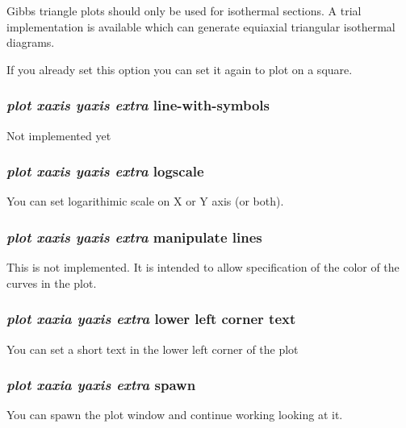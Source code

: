 \documentclass[11pt]{article}
\begin{document}
Gibbs triangle plots should only be used for isothermal sections.  A
trial implementation is available which can generate equiaxial
triangular isothermal diagrams.

If you already set this option you can set it again to plot on a square.

\hypertarget{Plot line symbols}{}
\subsubsection{{\em plot xaxis yaxis extra} line-with-symbols}

Not implemented yet

\hypertarget{Plot logax}{}
\subsubsection{{\em plot xaxis yaxis extra} logscale}

You can set logarithimic scale on X or Y axis (or both).

\hypertarget{Extra line-colors}{}
\subsubsection{{\em plot xaxis yaxis extra} manipulate lines}

This is not implemented.  It is intended to allow specification of the
color of the curves in the plot.

\hypertarget{Extra lower-left-corner}{}
\subsubsection{{\em plot xaxia yaxis extra} lower left corner text}

You can set a short text in the lower left corner of the plot

\hypertarget{Plot spawn}{}
\subsubsection{{\em plot xaxia yaxis extra} spawn}

You can spawn the plot window and continue working looking at it.

\hypertarget{Plot no heading}{}
\end{document}
